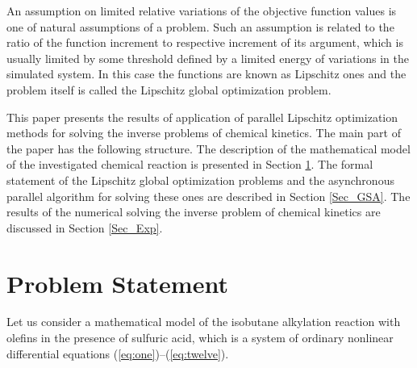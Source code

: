 \documentclass{svproc}
\begin{document}
An assumption on limited relative variations of the objective function values is one of natural assumptions of a problem. Such an assumption is related to the ratio of the function increment to respective increment of its argument, which is usually limited by some threshold defined by a limited energy of variations in the simulated system. In this case the functions are known as Lipschitz ones and the problem itself is called the Lipschitz global optimization problem. 

This paper presents the results of application of parallel Lipschitz optimization methods for solving the inverse problems of chemical kinetics. The main part of the paper has the following structure. The description of the mathematical model of the investigated chemical reaction is presented in Section \ref{Sec_math_mod}. The formal statement of the Lipschitz global optimization problems and the asynchronous parallel algorithm for solving these ones are described in Section \ref{Sec_GSA}. The results of the numerical solving the inverse problem of chemical kinetics are discussed in Section \ref{Sec_Exp}.

\section{Problem Statement}\label{Sec_math_mod}

Let us consider a mathematical model of the isobutane alkylation reaction with olefins in the presence of sulfuric acid, which is a system of ordinary nonlinear differential equations (\ref{eq:one})--(\ref{eq:twelve}).
\end{document}
